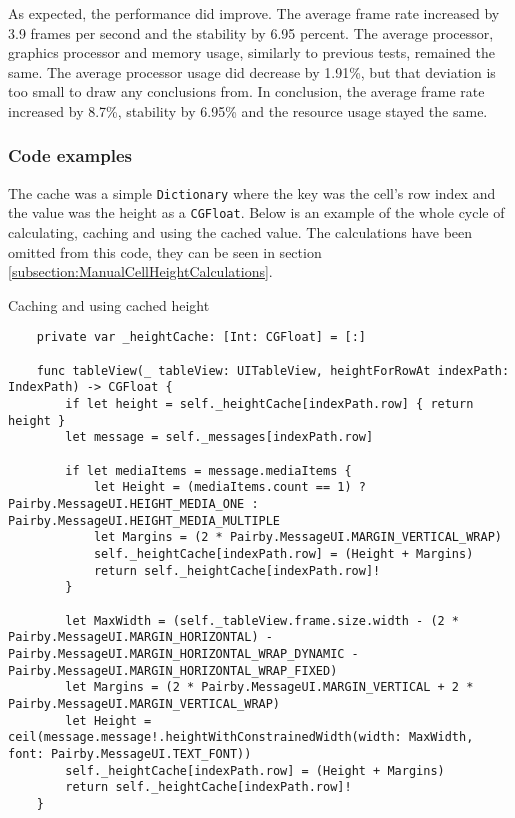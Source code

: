\documentclass[a4paper,12pt]{article}
\begin{document}
As expected, the performance did improve. The average frame rate increased by 3.9 frames per second and the stability by 6.95 percent. The average processor, graphics processor and memory usage, similarly to previous tests, remained the same. The average processor usage did decrease by 1.91\%, but that deviation is too small to draw any conclusions from. In conclusion, the average frame rate increased by 8.7\%, stability by 6.95\% and the resource usage stayed the same.

\subsubsection*{Code examples}
The cache was a simple \texttt{Dictionary} where the key was the cell's row index and the value was the height as a \texttt{CGFloat}. Below is an example of the whole cycle of calculating, caching and using the cached value. The calculations have been omitted from this code, they can be seen in section \ref{subsection:ManualCellHeightCalculations}. 
\begin{listing}[H]
  \caption{Caching and using cached height}
  \begin{verbatim}
    private var _heightCache: [Int: CGFloat] = [:]

    func tableView(_ tableView: UITableView, heightForRowAt indexPath: IndexPath) -> CGFloat {
        if let height = self._heightCache[indexPath.row] { return height }
        let message = self._messages[indexPath.row]

        if let mediaItems = message.mediaItems {
            let Height = (mediaItems.count == 1) ? Pairby.MessageUI.HEIGHT_MEDIA_ONE : Pairby.MessageUI.HEIGHT_MEDIA_MULTIPLE
            let Margins = (2 * Pairby.MessageUI.MARGIN_VERTICAL_WRAP)
            self._heightCache[indexPath.row] = (Height + Margins)
            return self._heightCache[indexPath.row]!
        }

        let MaxWidth = (self._tableView.frame.size.width - (2 * Pairby.MessageUI.MARGIN_HORIZONTAL) - Pairby.MessageUI.MARGIN_HORIZONTAL_WRAP_DYNAMIC - Pairby.MessageUI.MARGIN_HORIZONTAL_WRAP_FIXED)
        let Margins = (2 * Pairby.MessageUI.MARGIN_VERTICAL + 2 * Pairby.MessageUI.MARGIN_VERTICAL_WRAP)
        let Height = ceil(message.message!.heightWithConstrainedWidth(width: MaxWidth, font: Pairby.MessageUI.TEXT_FONT))
        self._heightCache[indexPath.row] = (Height + Margins)
        return self._heightCache[indexPath.row]!
    }
  \end{verbatim}
\end{listing}
\end{document}
